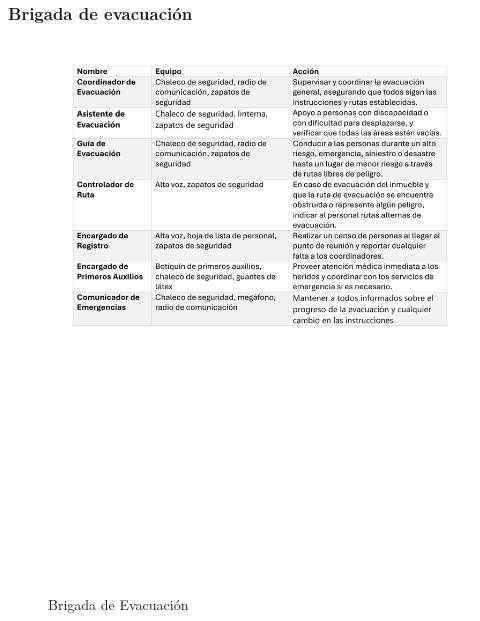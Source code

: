 \subsubsection{Brigada de evacuación}
%
%
\begin{figure}[H]
        \centering
        \includegraphics[trim = {15mm 120mm 10mm 3mm},clip,scale=0.43]{16/Img/brigadaDeEvacuacion.pdf}
        \caption{Brigada de Evacuación}
        \label{Brigada de Evacuación}
    \end{figure}
%
%
